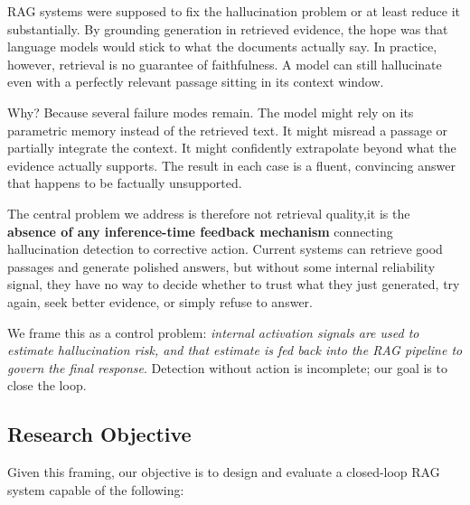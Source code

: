 RAG systems were supposed to fix the hallucination problem or at least reduce it substantially. By grounding generation in retrieved evidence, the hope was that language models would stick to what the documents actually say. In practice, however, retrieval is no guarantee of faithfulness. A model can still hallucinate even with a perfectly relevant passage sitting in its context window. 

 Why? Because several failure modes remain. The model might rely on its parametric memory instead of the retrieved text. It might misread a passage or partially integrate the context. It might confidently extrapolate beyond what the evidence actually supports. The result in each case is a fluent, convincing answer that happens to be factually unsupported.

The central problem we address is therefore not retrieval quality,it is the \textbf{absence of any inference-time feedback mechanism} connecting hallucination detection to corrective action. Current systems can retrieve good passages and generate polished answers, but without some internal reliability signal, they have no way to decide whether to trust what they just generated, try again, seek better evidence, or simply refuse to answer.

We frame this as a control problem: \emph{internal activation signals are used to estimate hallucination risk, and that estimate is fed back into the RAG pipeline to govern the final response}. Detection without action is incomplete; our goal is to close the loop.

\subsection{Research Objective}
\label{subsec:research_objective}

Given this framing, our objective is to design and evaluate a closed-loop RAG system capable of the following:

